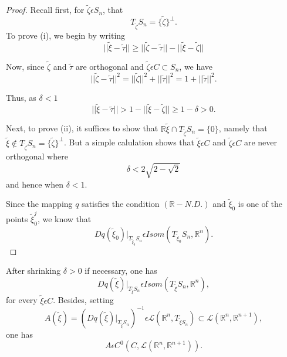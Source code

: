 \begin{proof}
Recall first, for $\widetilde{\zeta} \epsilon S_{n}$, that
$$
T_{\widetilde{\zeta}}S_{n} = \{\widetilde{\zeta}\}^{\perp}.
$$
To prove (i), we begin by writing
$$
||\widetilde{\xi} - \widetilde{\tau}|| \geq ||\widetilde{\zeta} -
\widetilde{\tau}|| - ||\widetilde{\xi} - \widetilde{\zeta}||
$$

Now, since $\widetilde{\zeta}$ and $\widetilde{\tau}$ are orthogonal
and $\widetilde{\zeta} \epsilon C \subset S_{n}$, we have
$$
||\widetilde{\zeta} - \widetilde{\tau}||^{2} =
||\widetilde{\zeta}||^{2} + ||\widetilde{\tau}||^{2} = 1 + ||\widetilde{\tau}||^{2}.
$$

Thus, as $\delta < 1$
$$
||\widetilde{\xi} - \widetilde{\tau}|| > 1 - ||\widetilde{\xi} -
\widetilde{\zeta}|| \geq 1 - \delta > 0.
$$

Next, to prove (ii), it suffices to show that
$\mathbb{R}\widetilde{\xi} \cap  T_{\widetilde{\zeta}}S_{n} = \{0\}$, namely
that $\widetilde{\xi} \notin T_{\widetilde{\zeta}}S_{n} =
\{\widetilde{\zeta}\}^{\perp}$. But a simple calulation shows that
$\widetilde{\xi} \epsilon C$ and $\widetilde{\zeta} \epsilon C$ are
never orthogonal where
$$
\delta < 2\sqrt{2 - \sqrt{2}}
$$
and hence when $\delta < 1$.

Since the mapping $q$ satisfies the condition $(\mathbb{R}-N.D.)$ and
$\widetilde{\xi}_{0}$ is one of the points $\widetilde{\xi}_{0}^{j}$,
we know that
$$
Dq(\widetilde{\xi}_{0}) |_{T_{\widetilde{\xi}_{0}} S_{n}} \epsilon
Isom (T_{\widetilde{\xi}_{0}}S_{n}, \mathbb{R}^{n}).
$$
\end{proof}

\begin{lemma}\label{chap4-lem2.2}
After shrinking $\delta > 0$ if necessary, one has
$$
Dq(\widetilde{\xi}) |_{T_{\widetilde{\xi}} S_{n}} \epsilon Isom
(T_{\widetilde{\xi}}S_{n}, \mathbb{R}^{n}),
$$\pageoriginale
for every $\widetilde{\xi} \epsilon C$. Besides, setting
\begin{equation*}
A(\widetilde{\xi}) = (Dq(\widetilde{\xi})
|_{T_{\widetilde{\xi}}S_{n}})^{-1} \epsilon \mathscr{L}
(\mathbb{R}^{n}, T_{\widetilde{\xi} S_{n}}) \subset
\mathscr{L}(\mathbb{R}^{n}, \mathbb{R}^{n+1}),\tag{2.3}\label{chap4-eq2.3}
\end{equation*}
one has
$$
A \epsilon C^{0} (C, \mathscr{L}(\mathbb{R}^{n}, \mathbb{R}^{n+1})).
$$
\end{lemma}

